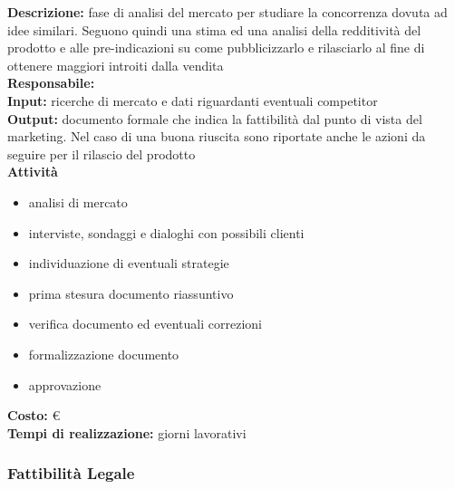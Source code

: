\textbf{Descrizione:} fase di analisi del mercato per studiare la concorrenza dovuta ad idee similari. Seguono quindi una stima ed una analisi della redditività del prodotto e alle pre-indicazioni su come pubblicizzarlo e rilasciarlo al fine di ottenere maggiori introiti dalla vendita\\
\linebreak
\textbf{Responsabile:} \\
\linebreak
\textbf{Input:} ricerche di mercato e dati riguardanti eventuali competitor \\
\linebreak
\textbf{Output:} documento formale che indica la fattibilità dal punto di vista del marketing.
Nel caso di una buona riuscita sono riportate anche le azioni da seguire per
il rilascio del prodotto\\
\linebreak
\textbf{Attività}
\begin{itemize}

\item analisi di mercato
\item interviste, sondaggi e dialoghi con possibili clienti
\item individuazione di eventuali strategie
\item prima stesura documento riassuntivo
\item verifica documento ed eventuali correzioni
\item formalizzazione documento
\item approvazione
\end{itemize}
\textbf{Costo:} \euro \\
\textbf{Tempi di realizzazione:}  giorni lavorativi


\subsubsection{Fattibilità Legale}

